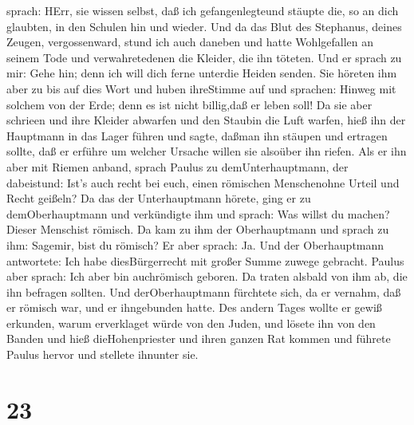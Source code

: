 sprach: HErr, sie wissen selbst, daß ich gefangenlegteund stäupte die,
so an dich glaubten, in den Schulen hin und wieder.  Und da
das Blut des Stephanus, deines Zeugen, vergossenward, stund ich auch
daneben und hatte Wohlgefallen an seinem Tode und verwahretedenen die
Kleider, die ihn töteten.  Und er sprach zu mir: Gehe hin;
denn ich will dich ferne unterdie Heiden senden.  Sie
höreten ihm aber zu bis auf dies Wort und huben ihreStimme auf und
sprachen: Hinweg mit solchem von der Erde; denn es ist nicht billig,daß
er leben soll!  Da sie aber schrieen und ihre Kleider
abwarfen und den Staubin die Luft warfen,  hieß ihn der
Hauptmann in das Lager führen und sagte, daßman ihn stäupen und ertragen
sollte, daß er erführe um welcher Ursache willen sie alsoüber ihn
riefen.  Als er ihn aber mit Riemen anband, sprach Paulus
zu demUnterhauptmann, der dabeistund: Ist's auch recht bei euch, einen
römischen Menschenohne Urteil und Recht geißeln?  Da das
der Unterhauptmann hörete, ging er zu demOberhauptmann und verkündigte
ihm und sprach: Was willst du machen? Dieser Menschist römisch.
 Da kam zu ihm der Oberhauptmann und sprach zu ihm:
Sagemir, bist du römisch? Er aber sprach: Ja.  Und der
Oberhauptmann antwortete: Ich habe diesBürgerrecht mit großer Summe
zuwege gebracht. Paulus aber sprach: Ich aber bin auchrömisch geboren.
 Da traten alsbald von ihm ab, die ihn befragen sollten.
Und derOberhauptmann fürchtete sich, da er vernahm, daß er römisch war,
und er ihngebunden hatte.  Des andern Tages wollte er gewiß
erkunden, warum erverklaget würde von den Juden, und lösete ihn von den
Banden und hieß dieHohenpriester und ihren ganzen Rat kommen und führete
Paulus hervor und stellete ihnunter sie.

\hypertarget{section-22}{%
\section{23}\label{section-22}}

